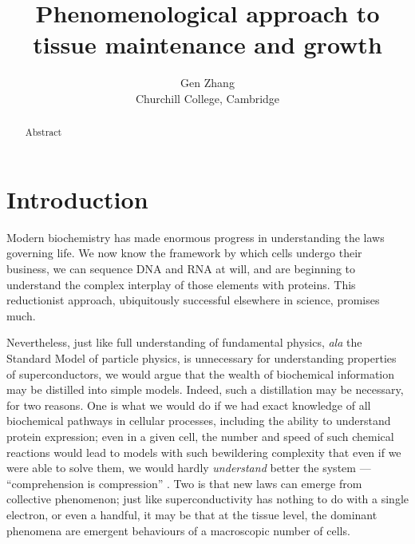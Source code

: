 \documentclass[10pt,english]{report}
\begin{document}
\author{Gen Zhang\\
	Churchill College, Cambridge}
\title{Phenomenological approach to tissue maintenance and growth}

\maketitle



\begin{abstract}
Abstract
\end{abstract}

\tableofcontents

\chapter{Introduction}
\setcounter{page}{1}

Modern biochemistry has made enormous progress in understanding the laws governing life. We now know the framework by which cells undergo their business, we can sequence DNA and RNA at will, and are beginning to understand the complex interplay of those elements with proteins. This reductionist approach, ubiquitously successful elsewhere in science, promises much.

Nevertheless, just like full understanding of fundamental physics, \emph{ala} the Standard Model of particle physics, is unnecessary for understanding properties of superconductors, we would argue that the wealth of biochemical information may be distilled into simple models. Indeed, such a distillation may be necessary, for two reasons. One is what we would do if we had exact knowledge of all biochemical pathways in cellular processes, including the ability to understand protein expression; even in a given cell, the number and speed of such chemical reactions would lead to models with such bewildering complexity that even if we were able to solve them, we would hardly \emph{understand} better the system --- ``comprehension is compression'' \citep{chaitin2002intelligibility}. Two is that new laws can emerge from collective phenomenon; just like superconductivity has nothing to do with a single electron, or even a handful, it may be that at the tissue level, the dominant phenomena are emergent behaviours of a macroscopic number of cells.
\end{document}
